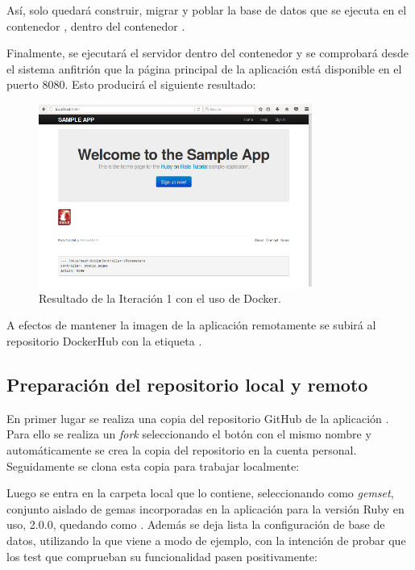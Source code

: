 Así, solo quedará construir, migrar y poblar la base de datos que se ejecuta en el contenedor , dentro del contenedor .

Finalmente, se ejecutará el servidor  dentro del contenedor  y se comprobará desde el sistema anfitrión que la página principal de la aplicación  está disponible en el puerto 8080. Esto producirá el siguiente resultado:

\begin{figure}[H]
\centering
\includegraphics[width=0.8\textwidth]{images/figures/resultado1.png}
\caption{Resultado de la Iteración 1 con el uso de Docker.\label{fig:figure_placement_example}}
\end{figure}

A efectos de mantener la imagen de la aplicación remotamente se subirá al repositorio DockerHub con la etiqueta .

\subsection{Preparación del repositorio local y remoto}

En primer lugar se realiza una copia del repositorio GitHub de la aplicación . Para ello se realiza un \textit{fork} seleccionando el botón con el mismo nombre y automáticamente se crea la copia del repositorio en la cuenta personal. Seguidamente se clona esta copia para trabajar localmente:


Luego se entra en la carpeta local que lo contiene, seleccionando como \textit{gemset}, conjunto aislado de gemas incorporadas en la aplicación para la versión Ruby en uso, 2.0.0, quedando como . Además se deja lista la configuración de base de datos, utilizando la que viene a modo de ejemplo, con la intención de probar que los test que comprueban su funcionalidad pasen positivamente: 


